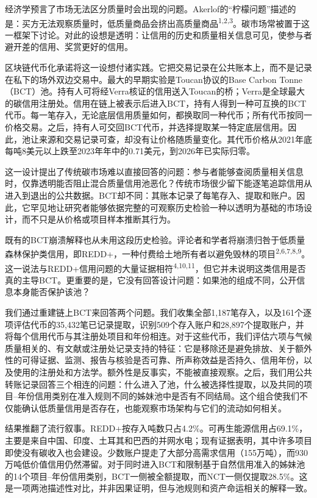 \documentclass[12pt,a4paper]{article}
\begin{document}
经济学预言了市场无法区分质量时会出现的问题。Akerlof的“柠檬问题”描述的是：买方无法观察质量时，低质量商品会挤出高质量商品\textsuperscript{1,2,3}。碳市场常被置于这一框架下讨论。对此的设想是透明：让信用的历史和质量相关信息可见，使参与者避开差的信用、奖赏更好的信用。

区块链代币化承诺将这一设想付诸实践。它把交易记录在公共账本上，而不是记录在私下的场外双边交易中。最大的早期实验是Toucan协议的Base Carbon Tonne（BCT）池。持有人可将经Verra核证的信用送入Toucan的桥；Verra是全球最大的碳信用注册处。信用在链上被表示后进入BCT，持有人得到一种可互换的BCT代币。每一笔存入，无论底层信用质量如何，都换取同一种代币；所有代币按同一价格交易。之后，持有人可交回BCT代币，并选择提取某一特定底层信用。因此，池让来源和交易记录可查，却没有让价格随质量变化。其代币价格从2021年底每吨8美元以上跌至2023年年中的0.71美元，到2026年已实际归零。

这一设计提出了传统碳市场难以直接回答的问题：参与者能够查阅质量相关信息时，仅靠透明能否阻止混合质量信用池恶化？传统市场很少留下能逐笔追踪信用从进入到退出的公共数据。BCT却不同：其账本记录了每笔存入、提取和账户。因此，它罕见地让研究者能够依据完整的可观察历史检验一种以透明为基础的市场设计，而不只是从价格或项目样本推断其行为。

既有的BCT崩溃解释也从未用这段历史检验。评论者和学者将崩溃归咎于低质量森林保护类信用，即REDD+，一种付费给土地所有者以避免毁林的项目\textsuperscript{2,6,7,8,9}。这一说法与REDD+信用问题的大量证据相符\textsuperscript{4,10,11}，但它并未说明这类信用是否真的主导BCT。更重要的是，它没有回答设计问题：如果池的组成不同，公开信息本身能否保护该池？

我们通过重建链上BCT来回答两个问题。我们收集全部1,187笔存入，以及161个逐项评估代币的35,432笔已记录提取，识别509个存入账户和28,897个提取账户，并将每个信用代币与其注册处项目和年份相连。对于这些代币，我们评估六项与气候质量相关的、有文献或注册处记录支持的特征：它是移除还是避免排放、关于额外性的可得证据、监测、报告与核验是否可靠、所声称效益是否持久、信用年份，以及使用的注册处和方法学。额外性是反事实，不能被直接观察。之后，我们用公共转账记录回答三个相连的问题：什么进入了池，什么被选择性提取，以及共同的项目--年份信用类别在准入规则不同的姊妹池中是否有不同结局。这个组合使我们不仅能确认低质量信用是否存在，也能观察市场架构与它们的流动如何相关。

结果推翻了流行叙事。REDD+按存入吨数只占4.2\%。可再生能源信用占69.1\%，主要是来自中国、印度、土耳其和巴西的并网水电；现有证据表明，其中许多项目即使没有碳收入也会建设。少数账户提走了大部分高需求信用（155万吨），而930万吨低价值信用仍然滞留。对于同时进入BCT和限制基于自然信用准入的姊妹池的14个项目--年份信用类别，BCT一侧被全额提取，而NCT一侧仅提取28.5\%。这是一项两池描述性对比，并非因果证明，但与池规则和资产命运相关的解释一致。
\end{document}

